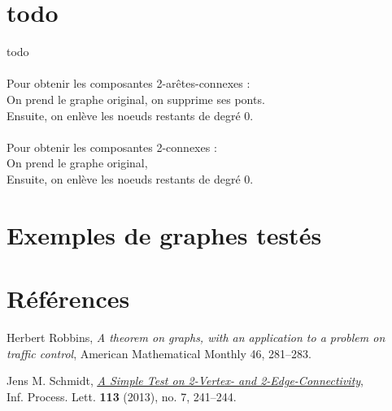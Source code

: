 \documentclass{article}      %
\begin{document}
\section{todo}
todo
\\\\Pour obtenir les composantes 2-arêtes-connexes :
\\On prend le graphe original, on supprime ses ponts.
\\Ensuite, on enlève les noeuds restants de degré 0.
%
\\\\Pour obtenir les composantes 2-connexes :
\\On prend le graphe original, 
\\Ensuite, on enlève les noeuds restants de degré 0.
\section{Exemples de graphes testés}



\section{Références}
\begin{thebibliography}{9}
Herbert Robbins, \textit{A theorem on graphs, with an application to a problem on traffic control}, American Mathematical Monthly 46, 281–283.

Jens M. Schmidt, \href{https://arxiv.org/ftp/arxiv/papers/1209/1209.0700.pdf}{\underline{\textit{A Simple Test on 2-Vertex- and 2-Edge-Connectivity}}},
\\Inf. Process. Lett. \textbf{113} (2013), no. 7, 241–244.
\end{thebibliography}
\end{document}
